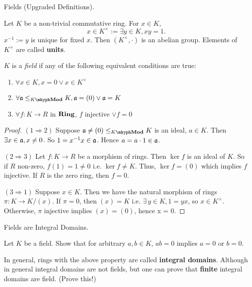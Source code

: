 \documentclass[../../book.tex]{subfiles}
\begin{document}
\begin{dfn} Fields (Upgraded Definitions).

    Let $K$ be a non-trivial commutative ring. 
    For $x \in K$, 
    \[
        x \in K^\times := \exists y \in K, xy = 1. 
    \]
    $x^{-1} := y$ is unique for fixed $x$. 
    Then $(K^\times, \cdot)$ is an abelian group. 
    Elements of $K^\times$ are called \textbf{units}. 

    $K$ is a \emph{field} if any of the following equivalent conditions are true:
    \begin{enumerate}
        \item $\forall x \in K, x = 0 \lor x \in K^\times$
        \item $\forall \fa \leq_{\mod{K}} K, \fa = (0) \lor \fa = K$
        \item $\forall f : K \to R$ in $\mathbf{Ring}$, $f$ injective $\lor f = 0$
    \end{enumerate}
\end{dfn}
\begin{proof} 
    $(1 \Rightarrow  2)$
    Suppose $\fa \neq (0) \leq_{\mod{K}} K$ is an ideal, $a \in K$. 
    Then $\exists x \in \mathfrak{a}, x \neq 0$.
    So $1 = x^{-1} x \in \mathfrak{a}$. 
    Hence $a = a\cdot1 \in \mathfrak{a}$. 

    $(2 \Rightarrow 3)$ 
    Let $f : K \to R$ be a morphism of rings. 
    Then $\ker f$ is an ideal of $K$. 
    So if $R$ non-zero, $f(1) = 1 \neq 0$ i.e. $\ker f \neq K$. 
    Thus, $\ker f = (0)$ which implies $f$ injective.  
    If $R$ is the zero ring, then $f = 0$. 

    $(3 \Rightarrow 1)$ 
    Suppose $x \in K$. 
    Then we have the natural morphism of rings $\pi : K \to K/(x)$. 
    If $\pi = 0$, then $(x) = K$ i.e. $\exists\,y \in K, 1 = yx$,
    so $x \in K^\times$. 
    Otherwise, $\pi$ injective implies $(x) = (0)$, hence x = 0. 
\end{proof}

\begin{ex} [Important] Fields are Integral Domains.
    
    Let $K$ be a field. 
    Show that for arbitrary $a, b \in K$, $ab = 0$ implies $a = 0$ or $b = 0$.
    
    In general, rings with the above property are called \textbf{integral domains}. 
    Although in general integral domains are not fields, 
    but one can prove that \textbf{finite} integral domains are field. 
    (Prove this!)
\end{ex}
\end{document}
